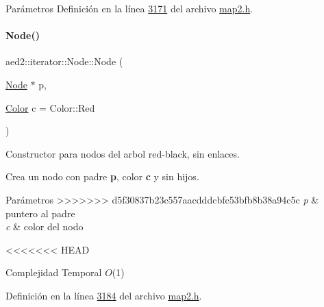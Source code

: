 \begin{DoxyParams}{\-Parámetros}
Definición en la línea \hyperlink{map2_8h_source_l03171}{3171} del archivo \hyperlink{map2_8h_source}{map2.\+h}.

\mbox{\label{structaed2_1_1iterator_1_1Node_a1f7307020ba416915f60d2dd938df845_a1f7307020ba416915f60d2dd938df845}} 
\paragraph{\texorpdfstring{Node()}{Node()}\hspace{0.1cm}{\footnotesize\ttfamily [2/2]}}
{\footnotesize\ttfamily aed2\+::iterator\+::\+Node\+::\+Node (\begin{DoxyParamCaption}\item[{\hyperlink{structaed2_1_1iterator_1_1Node}{Node} $\ast$}]{p,  }\item[{\hyperlink{classaed2_1_1iterator_aaa188f82ba585d8de525b1400242cf4f_aaa188f82ba585d8de525b1400242cf4f}{Color}}]{c = {\ttfamily Color\+:\+:Red} }\end{DoxyParamCaption})\hspace{0.3cm}{\ttfamily [inline]}}



Constructor para nodos del arbol red-\/black, sin enlaces. 

Crea un nodo con padre {\bfseries p}, color {\bfseries c} y sin hijos.


\begin{DoxyParams}{Parámetros}
>>>>>>> d5f30837b23c557aacdddcbfc53bfb8b38a94c5c
{\em p} & puntero al padre \\
\hline
{\em c} & color del nodo\\
\hline
\end{DoxyParams}

\begin{DoxyDescription}
<<<<<<< HEAD
\item[\-Complejidad \-Temporal]$O$(1)
\end{DoxyDescription}

\-Definición en la línea \hyperlink{map2_8h_source_l03184}{3184} del archivo \hyperlink{map2_8h_source}{map2.\-h}.

\hypertarget{structaed2_1_1iterator_1_1Node_ab9a8f2970d15b72a4d1d20f8bf853d4b_ab9a8f2970d15b72a4d1d20f8bf853d4b}{
}
\end{DoxyParams}
